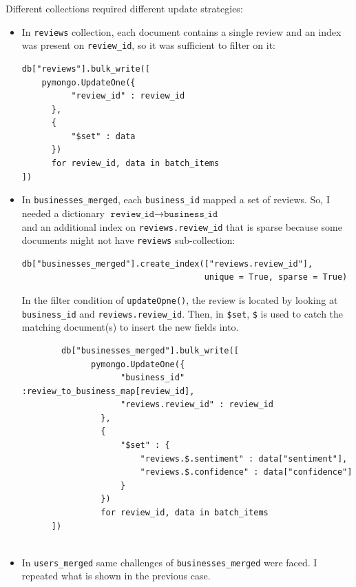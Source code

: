 \documentclass{Configuration_Files/PoliMi3i_thesis}
\begin{document}
Different collections required different update strategies:
\begin{itemize}
    \item In \texttt{reviews} collection, each document contains a single review and an index was present on \texttt{review\_id}, so it was sufficient to filter on it:
    \bigskip
    
    \begin{verbatim}
db["reviews"].bulk_write([
    pymongo.UpdateOne({
          "review_id" : review_id
      },
      {
          "$set" : data
      })
      for review_id, data in batch_items
])
    \end{verbatim}
    
    \bigskip

    \item In \texttt{businesses\_merged}, each \texttt{business\_id} mapped a set of reviews. So, I needed a dictionary $\texttt{review\_id} \longrightarrow \texttt{business\_id}$ \\and an additional index on \texttt{reviews.review\_id} that is sparse because some documents might not have \texttt{reviews} sub-collection:
    \bigskip
    
    \begin{verbatim}
db["businesses_merged"].create_index(["reviews.review_id"], 
                                     unique = True, sparse = True)
    \end{verbatim}
    
    \bigskip
    In the filter condition of \texttt{updateOpne()}, the review is located by looking at \texttt{business\_id} and \texttt{reviews.review\_id}. Then, in \texttt{\$set}, \texttt{\$} is used to catch the matching document(s) to insert the new fields into.
    \bigskip
    
    \begin{verbatim}
        db["businesses_merged"].bulk_write([
              pymongo.UpdateOne({ 
                    "business_id" :review_to_business_map[review_id],
                    "reviews.review_id" : review_id 
                },
                {
                    "$set" : {
                        "reviews.$.sentiment" : data["sentiment"],
                        "reviews.$.confidence" : data["confidence"]  
                    }
                })
                for review_id, data in batch_items
      ])
        
    \end{verbatim}
    
    \bigskip

    \item In \texttt{users\_merged} same challenges of \texttt{businesses\_merged} were faced. I repeated what is shown in the previous case.
\end{itemize}
\end{document}
